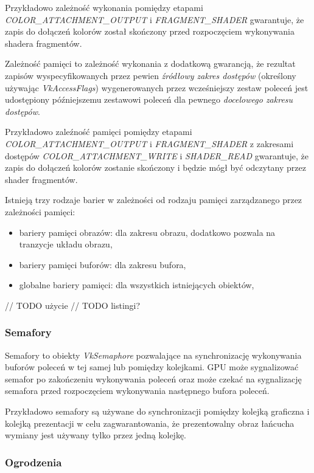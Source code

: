 Przykładowo zależność wykonania pomiędzy etapami
\textit{COLOR\_ATTACHMENT\_OUTPUT} i \textit{FRAGMENT\_SHADER} gwarantuje, że zapis do dołączeń kolorów został skończony przed rozpoczęciem
wykonywania shadera fragmentów.

Zależność pamięci to zależność wykonania z dodatkową gwarancją, że rezultat zapisów wyspecyfikowanych przez pewien \textit{źródłowy
zakres dostępów} (określony używając \textit{VkAccessFlags}) wygenerowanych przez wcześniejszy zestaw poleceń jest udostępiony
późniejszemu zestawowi poleceń dla pewnego \textit{docelowego zakresu dostępów}.

Przykładowo zaleźność pamięci pomiędzy etapami
\textit{COLOR\_ATTACHMENT\_OUTPUT} i \textit{FRAGMENT\_SHADER} z zakresami dostępów \textit{COLOR\_ATTACHMENT\_WRITE} i \textit{SHADER\_READ} gwarantuje, że zapis
do dołączeń kolorów zostanie skończony i będzie mógł być odczytany przez shader fragmentów.

Istnieją trzy rodzaje barier w zależności od rodzaju pamięci zarządzanego przez zależności pamięci:

\begin{itemize}
	\item {bariery pamięci obrazów}: dla zakresu obrazu, dodatkowo pozwala na tranzycje układu obrazu,
	\item {bariery pamięci buforów}: dla zakresu bufora,
	\item {globalne bariery pamięci}: dla wszystkich istniejących obiektów,
\end{itemize}

// TODO użycie
// TODO listingi?

\subsubsection{Semafory}

Semafory to obiekty \textit{VkSemaphore} pozwalające na synchronizację wykonywania buforów poleceń w tej samej lub pomiędzy kolejkami. GPU
może sygnalizować semafor po zakończeniu wykonywania poleceń oraz może czekać na sygnalizację semafora przed
rozpoczęciem wykonywania następnego bufora poleceń.

Przykładowo semafory są używane do synchronizacji pomiędzy kolejką
graficzna i kolejką prezentacji w celu zagwarantowania, że prezentowalny obraz łańcucha wymiany jest używany tylko przez jedną kolejkę.

\subsubsection{Ogrodzenia}

